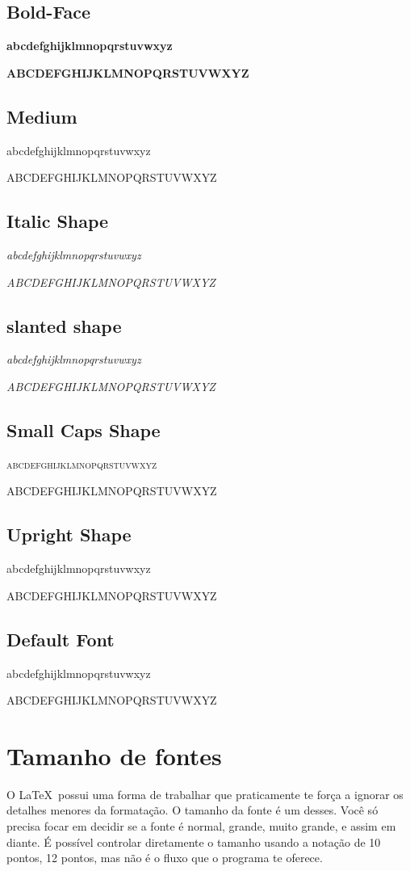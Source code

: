 \documentclass[a4paper, 12pt, oneside]{book}
\begin{document}
\subsection{Bold-Face}
\textbf{abcdefghijklmnopqrstuvwxyz}

\textbf{ABCDEFGHIJKLMNOPQRSTUVWXYZ}

\subsection{Medium}
\textmd{abcdefghijklmnopqrstuvwxyz}

\textmd{ABCDEFGHIJKLMNOPQRSTUVWXYZ}

\subsection{Italic Shape}
\textit{abcdefghijklmnopqrstuvwxyz}

\textit{ABCDEFGHIJKLMNOPQRSTUVWXYZ}

\subsection{slanted shape}
\textsl{abcdefghijklmnopqrstuvwxyz}

\textsl{ABCDEFGHIJKLMNOPQRSTUVWXYZ}

\subsection{Small Caps Shape}
\textsc{abcdefghijklmnopqrstuvwxyz}

\textsc{ABCDEFGHIJKLMNOPQRSTUVWXYZ}

\subsection{Upright Shape}
\textup{abcdefghijklmnopqrstuvwxyz}

\textup{ABCDEFGHIJKLMNOPQRSTUVWXYZ}

\subsection{Default Font}
\textnormal{abcdefghijklmnopqrstuvwxyz}

\textnormal{ABCDEFGHIJKLMNOPQRSTUVWXYZ}

\section{Tamanho de fontes}
O \LaTeX\ possui uma forma de trabalhar que praticamente te força a ignorar os detalhes menores da formatação.
O tamanho da fonte é um desses.
Você só precisa focar em decidir se a fonte é normal, grande, muito grande, e assim em diante.
É possível controlar diretamente o tamanho usando a notação de 10 pontos, 12 pontos, mas não é o fluxo que o programa te oferece.
\end{document}
